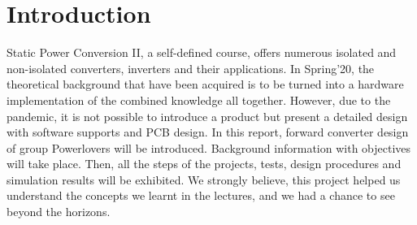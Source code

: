 \section{Introduction}

Static Power Conversion II, a self-defined course, offers numerous isolated and non-isolated converters, inverters and their applications. In Spring'20, the theoretical background that have been acquired is to be turned into a hardware implementation of the combined knowledge all together. However, due to the pandemic, it is not possible to introduce a product but present a detailed design with software supports and PCB design. In this report, forward converter design of group Powerlovers will be introduced. Background information with objectives will take place. Then, all the steps of the projects, tests, design procedures and simulation results will be exhibited. We strongly believe, this project helped us understand the concepts we learnt in the lectures, and we had a chance to see beyond the horizons.